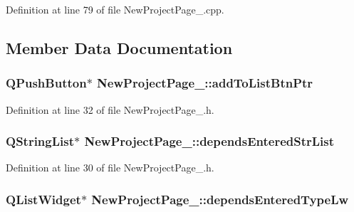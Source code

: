 Definition at line 79 of file New\-Project\-Page\-\_.\-cpp.



\subsection{Member Data Documentation}
\hypertarget{class_new_project_page__4_a66d4547315df8e6207ffeefd779f7e86}{
\subsubsection[{add\-To\-List\-Btn\-Ptr}]{\setlength{\rightskip}{0pt plus 5cm}Q\-Push\-Button$\ast$ New\-Project\-Page\-\_\-::add\-To\-List\-Btn\-Ptr\hspace{0.3cm}{\ttfamily [private]}}}\label{class_new_project_page__4_a66d4547315df8e6207ffeefd779f7e86}


Definition at line 32 of file New\-Project\-Page\-\_.\-h.

\hypertarget{class_new_project_page__4_a1319d6e28b3648b02180579e813ecafb}{
\subsubsection[{depends\-Entered\-Str\-List}]{\setlength{\rightskip}{0pt plus 5cm}Q\-String\-List$\ast$ New\-Project\-Page\-\_\-::depends\-Entered\-Str\-List\hspace{0.3cm}{\ttfamily [private]}}}\label{class_new_project_page__4_a1319d6e28b3648b02180579e813ecafb}


Definition at line 30 of file New\-Project\-Page\-\_.\-h.

\hypertarget{class_new_project_page__4_a1cec1dfe07663bca42ba8ce013735d4c}{
\subsubsection[{depends\-Entered\-Type\-Lw}]{\setlength{\rightskip}{0pt plus 5cm}Q\-List\-Widget$\ast$ New\-Project\-Page\-\_\-::depends\-Entered\-Type\-Lw\hspace{0.3cm}{\ttfamily [private]}}}\label{class_new_project_page__4_a1cec1dfe07663bca42ba8ce013735d4c}


